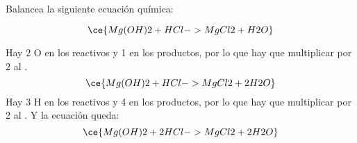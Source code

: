 Balancea la siguiente ecuación química:

\[
    \ce{Mg(OH)2 + HCl -> MgCl2 + H2O}
\]

\begin{solutionbox}{3cm}
    Hay  2 O en los reactivos y 1 en los productos, por lo que hay que multiplicar por 2 al .
    \[
        \ce{Mg(OH)2 + HCl -> MgCl2 + 2H2O}
    \]
    Hay 3 H en los reactivos y 4 en los productos, por lo que hay que multiplicar por 2 al . Y la ecuación queda:
    \[
        \ce{Mg(OH)2 + 2HCl -> MgCl2 + 2H2O}
    \]
\end{solutionbox}